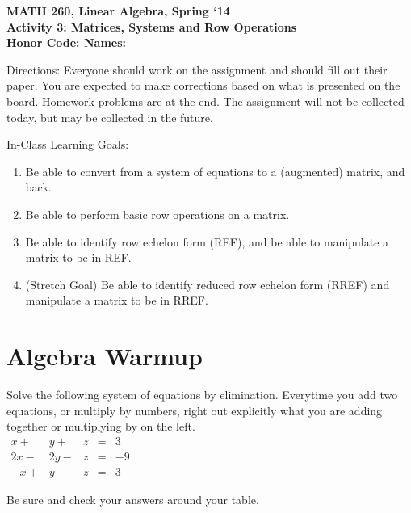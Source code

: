 \documentclass{article}
\begin{document}
\begin{flushleft}
	\bfseries{MATH 260, Linear Algebra, Spring `14}\\
	\bfseries{Activity 3:  Matrices, Systems and Row Operations}\\
	\bfseries{Honor Code:} \hspace{3.5in}\bfseries{Names:}\\
\end{flushleft}
\begin{flushleft}
\vspace{.75in}
Directions:  Everyone should work on the assignment and should fill out their paper.  You are expected to make corrections based on what is presented on the board.  Homework problems are at the end.  The assignment will not be collected today, but may be collected in the future.

\vspace{0.2in}
\Large
In-Class Learning Goals:\\
\normalsize
\begin{enumerate}
\item Be able to convert from a system of equations to a (augmented) matrix, and back.
\item Be able to perform basic row operations on a matrix.
\item Be able to identify row echelon form (REF), and be able to manipulate a matrix to be in REF.
\item (Stretch Goal) Be able to identify reduced row echelon form (RREF) and manipulate a matrix to be in RREF.
\end{enumerate}
\vspace{0.1in}
\section*{Algebra Warmup}
Solve the following system of equations by elimination. Everytime you add two equations, or multiply by numbers, right out explicitly what you are adding together or multiplying by on the left.\\
$\begin{array}{rrrcr}
x+&y+&z&=&3\\
2x-&2y-&z&=&-9\\
-x+&y-&z&=&3
\end{array}
$

\vspace{2in}
Be sure and check your answers around your table.\\

\end{flushleft}
\end{document}
